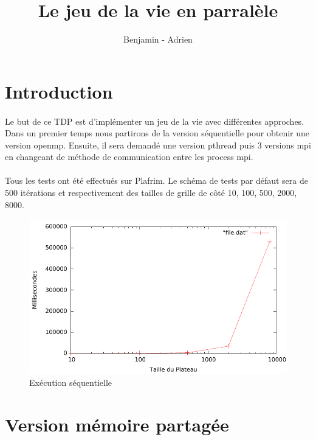 \documentclass[12pt]{article}
\title{Le jeu de la vie en parralèle}
\author{Benjamin \bsc{Angelaud} - Adrien \bsc{Guilbaud}}
\begin{document}
\maketitle

\section{Introduction}
\paragraph{}Le but de ce TDP est d'implémenter un jeu de la vie avec différentes approches. Dans un premier temps nous partirons de la version séquentielle pour obtenir une version openmp. Ensuite, il sera demandé une version pthread puis 3 versions mpi en changeant de méthode de communication entre les process mpi.

\paragraph{}Tous les tests ont été effectués sur Plafrim. Le schéma de tests par défaut sera de 500 itérations et respectivement des tailles de grille de côté 10, 100, 500, 2000, 8000.

\begin{figure}[!h]
	\begin{center}
		\includegraphics[scale=0.5]{seq.pdf}
	\end{center}
	\caption{Exécution séquentielle \label{fig:life_seq}}
\end{figure} 

\section{Version mémoire partagée}
\end{document}

